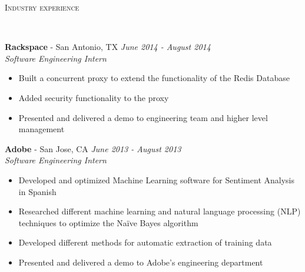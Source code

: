 \documentclass{article}
\newenvironment{changemargin}[2]{%
  \begin{list}{}{%
    \setlength{\topsep}{0pt}%
    \setlength{\leftmargin}{#1}%
    \setlength{\rightmargin}{#2}%
    \setlength{\listparindent}{\parindent}%
    \setlength{\itemindent}{\parindent}%
    \setlength{\parsep}{\parskip}%
  }%
  \item[]}{\end{list}
}
\newcommand{\lineover}{
	\begin{changemargin}{-0.05in}{-0.05in}
		\vspace*{-8pt}
		\hrulefill \\
		\vspace*{-2pt}
	\end{changemargin}
}
\newcommand{\header}[1]{
	\begin{changemargin}{-0.5in}{-0.5in}
		\scshape{#1}\\
  	\lineover
	\end{changemargin}
}
\newenvironment{body} {
	\vspace*{-16pt}
	\begin{changemargin}{-0.25in}{-0.5in}
  }	
	{\end{changemargin}
}
\begin{document}
\header{Industry experience}
\begin{body}
	\vspace{16pt}
    \textbf{Rackspace} - San Antonio, TX \hfill \emph{June 2014 - August 2014}\\
	\emph{Software Engineering Intern}\\
	\vspace*{-3pt}
	\begin{itemize} \itemsep -2pt
		\item Built a concurrent proxy to extend the functionality of the Redis Database
        \item Added security functionality to the proxy
        \item Presented and delivered a demo to engineering team and higher level management
	\end{itemize}
   
   	\textbf{Adobe} - San Jose, CA \hfill \emph{June 2013 - August 2013}\\
	\emph{Software Engineering Intern}\\
	\vspace*{-3pt}
	\begin{itemize} \itemsep -2pt
		\item Developed and optimized Machine Learning software for Sentiment Analysis in Spanish
        \item Researched different machine learning and natural language processing (NLP) techniques to optimize the Naïve Bayes algorithm
        \item Developed different methods for automatic extraction of training data
        \item Presented and delivered a demo to Adobe's engineering department
	\end{itemize}

\end{body}


    
        
\end{document}
